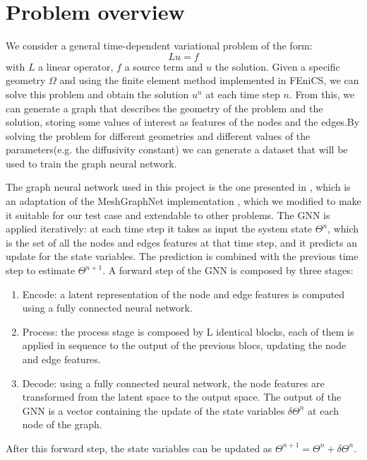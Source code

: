\documentclass[11pt,a4paper]{article}
\begin{document}
\section{Problem overview}

We consider a general time-dependent variational problem of the form:
\[Lu=f\]
with \(L\) a linear operator, \(f\) a source term and \(u\) the solution. Given a specific geometry \(\Omega\) and using the finite element method implemented in FEniCS, we can solve this problem and obtain the solution \(u^{n}\) at each time step \(n\). From this, we can generate a graph that describes the geometry of the problem and the solution, storing some values of interest as features of the nodes and the edges.By solving the problem for different geometries and different values of the parameters(e.g. the diffusivity constant) we can generate a dataset that will be used to train the graph neural network. 

The graph neural network used in this project is the one presented in \cite{Luca}, which is an adaptation of the MeshGraphNet implementation \cite{MeshGraphNet}, which we modified to make it suitable for our test case and extendable to other problems.
The GNN is applied iteratively: at each time step it takes as input the system state \(\Theta^{n}\), which is the set of all the nodes and edges features at that time step, and it predicts an update for the state variables. The prediction is combined with the previous time step to estimate \(\Theta^{n+1}\). 
A forward step of the GNN is composed by three stages:
\begin{enumerate}
    \item Encode: a latent representation of the node and edge features is computed using a fully connected neural network.
    \item Process: the process stage is composed by L identical blocks, each of them is applied in sequence to the output of the previous blocs, updating the node and edge features. 
    \item Decode: using a fully connected neural network, the node features are transformed from the latent space to the output space. The output of the GNN is a vector containing the update of the state variables \(\delta\Theta^n\) at each node of the graph. 
\end{enumerate}
After this forward step, the state variables can be updated as \(\Theta^{n+1} = \Theta^{n} + \delta\Theta^{n}\).
\end{document}
